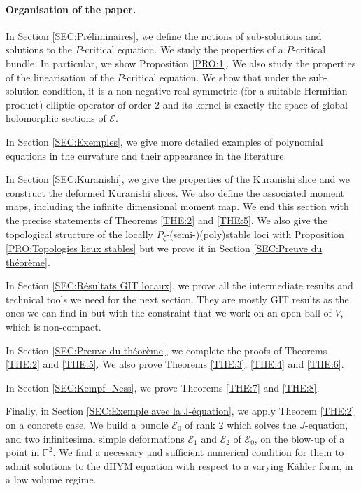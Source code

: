 \documentclass{article}
\theoremstyle{remark}
\theoremstyle{definition}
\renewcommand{\P}{\mathbb{P}}
\newcommand{\E}{\mathcal{E}}
\begin{document}
\paragraph{Organisation of the paper.}

In Section \ref{SEC:Préliminaires}, we define the notions of sub-solutions and solutions to the $P$-critical equation. We study the properties of a $P$-critical bundle. In particular, we show Proposition \ref{PRO:1}. We also study the properties of the linearisation of the $P$-critical equation. We show that under the sub-solution condition, it is a non-negative real symmetric (for a suitable Hermitian product) elliptic operator of order $2$ and its kernel is exactly the space of global holomorphic sections of $\E$.

In Section \ref{SEC:Exemples}, we give more detailed examples of polynomial equations in the curvature and their appearance in the literature.

In Section \ref{SEC:Kuranishi}, we give the properties of the Kuranishi slice and we construct the deformed Kuranishi slices. We also define the associated moment maps, including the infinite dimensional moment map. We end this section with the precise statements of Theorems \ref{THE:2} and \ref{THE:5}. We also give the topological structure of the locally $P_\zeta$-(semi-)(poly)stable loci with Proposition \ref{PRO:Topologies lieux stables} but we prove it in Section \ref{SEC:Preuve du théorème}.

In Section \ref{SEC:Résultats GIT locaux}, we prove all the intermediate results and technical tools we need for the next section. They are mostly GIT results as the ones we can find in \cite{GRS} but with the constraint that we work on an open ball of $V$, which is non-compact.

In Section \ref{SEC:Preuve du théorème}, we complete the proofs of Theorems \ref{THE:2} and \ref{THE:5}. We also prove Theorems \ref{THE:3}, \ref{THE:4} and \ref{THE:6}.

In Section \ref{SEC:Kempf--Ness}, we prove Theorems \ref{THE:7} and \ref{THE:8}.

Finally, in Section \ref{SEC:Exemple avec la J-équation}, we apply Theorem \ref{THE:2} on a concrete case. We build a bundle $\E_0$ of rank $2$ which solves the $J$-equation, and two infinitesimal simple deformations $\E_1$ and $\E_2$ of $\E_0$, on the blow-up of a point in $\P^2$. We find a necessary and sufficient numerical condition for them to admit solutions to the dHYM equation with respect to a varying Kähler form, in a low volume regime.
\end{document}
